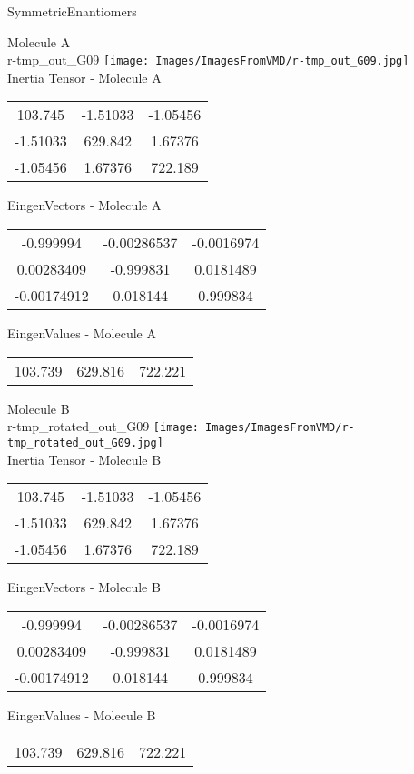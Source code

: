 \vtab[-2cm]
\begin{center}
{\large SymmetricEnantiomers}
\end{center}
\begin{multicols}{2}
\begin{center}
Molecule A \\ 
r-tmp\_out\_G09
\texttt{[image: Images/ImagesFromVMD/r-tmp\_out\_G09.jpg]}
\\
Inertia Tensor - Molecule A \\
\vtab
\begin{tabular}{|c c c|}
103.745	 & 	-1.51033	 & 	-1.05456	 \\
-1.51033	 & 	629.842	 & 	1.67376	 \\
-1.05456	 & 	1.67376	 & 	722.189
\end{tabular}

\vtab
 EingenVectors - Molecule A     \\
\vtab
\begin{tabular}{|c c c|}
-0.999994	 & 	-0.00286537	 & 	-0.0016974	 \\
0.00283409	 & 	-0.999831	 & 	0.0181489	 \\
-0.00174912	 & 	0.018144	 & 	0.999834
\end{tabular}

\vtab
 EingenValues - Molecule A     \\
\vtab
\begin{tabular}{|c c c|}
103.739	 & 	629.816	 & 	722.221
\end{tabular}
\columnbreak

Molecule B \\ 
r-tmp\_rotated\_out\_G09
\texttt{[image: Images/ImagesFromVMD/r-tmp\_rotated\_out\_G09.jpg]}
\\
Inertia Tensor - Molecule B \\
\vtab
\begin{tabular}{|c c c|}
103.745	 & 	-1.51033	 & 	-1.05456	 \\
-1.51033	 & 	629.842	 & 	1.67376	 \\
-1.05456	 & 	1.67376	 & 	722.189
\end{tabular}

\vtab
 EingenVectors - Molecule B     \\
\vtab
\begin{tabular}{|c c c|}
-0.999994	 & 	-0.00286537	 & 	-0.0016974	 \\
0.00283409	 & 	-0.999831	 & 	0.0181489	 \\
-0.00174912	 & 	0.018144	 & 	0.999834
\end{tabular}

\vtab
 EingenValues - Molecule B     \\
\vtab
\begin{tabular}{|c c c|}
103.739	 & 	629.816	 & 	722.221
\end{tabular}

\end{center}
\end{multicols}
